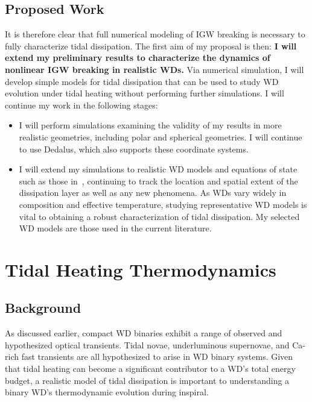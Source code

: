 \documentclass[12pt,
        usenames, %
        dvipsnames %
    ]{article}
\begin{document}
\subsection{Proposed Work}

It is therefore clear that full numerical modeling of IGW breaking is necessary
to fully characterize tidal dissipation. The first aim of my proposal is then:
\textbf{I will extend my preliminary results to characterize the dynamics of
nonlinear IGW breaking in realistic WDs.} Via numerical simulation, I will
develop simple models for tidal dissipation that can be used to study WD
evolution under tidal heating without performing further simulations. I will
continue my work in the following stages:
\begin{itemize}
    \item I will perform simulations examining the validity of my results in
        more realistic geometries, including polar and spherical geometries. I
        will continue to use Dedalus, which also supports these coordinate
        systems.

    \item I will extend my simulations to realistic WD models and equations of
        state such as those in~\cite{brassard1992}, continuing to track the
        location and spatial extent of the dissipation layer as well as any new
        phenomena. As WDs vary widely in composition and effective temperature,
        studying representative WD models is vital to obtaining a robust
        characterization of tidal dissipation. My selected WD models are those
        used in the current literature\cite{fullerII, fullerIV}.
\end{itemize}

\section{Tidal Heating Thermodynamics}\label{s:3}

\subsection{Background}

As discussed earlier, compact WD binaries exhibit a range of observed and
hypothesized optical transients. Tidal novae\cite{tidal_novae}, underluminous
supernovae\cite{underlum}, and Ca-rich fast transients\cite{carich} are all
hypothesized to arise in WD binary systems. Given that tidal heating can become
a significant contributor to a WD's total energy budget, a realistic model of
tidal dissipation is important to understanding a binary WD's thermodynamic
evolution during inspiral.
\end{document}
